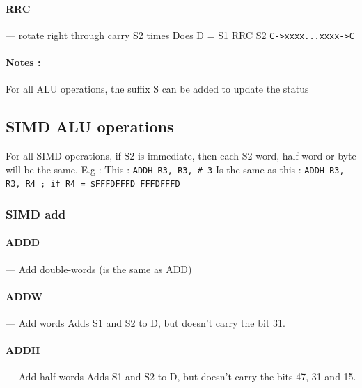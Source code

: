 \documentclass[11pt]{article}
\begin{document}
\paragraph{RRC} --- rotate right through carry S2 times\newline
Does \newline D = S1 RRC S2\newline
\texttt{C->xxxx...xxxx->C}

\paragraph{Notes : }
For all ALU operations, the suffix S can be added to update the status

\newpage
\subsection{SIMD ALU operations}

For all SIMD operations, if S2 is immediate, then each S2 word, half-word or byte
will be the same. E.g : \newline
This : \newline
\texttt{ADDH R3, R3, \#-3}\newline
Is the same as this : \newline
\texttt{ADDH R3, R3, R4 ; if R4 = \$FFFDFFFD FFFDFFFD}\newline

\subsubsection{SIMD add}

\paragraph{ADDD} --- Add double-words (is the same as ADD)\newline

\paragraph{ADDW} --- Add words\newline
Adds S1 and S2 to D, but doesn't carry the bit 31.

\paragraph{ADDH} --- Add half-words\newline
Adds S1 and S2 to D, but doesn't carry the bits 47, 31 and 15.
\end{document}
